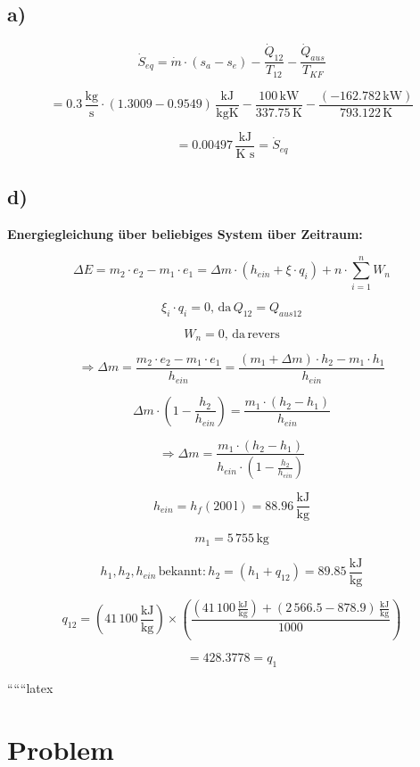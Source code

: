 \subsection*{a)}

\[
\dot{S}_{eq} = \dot{m} \cdot (s_{a} - s_{e}) - \frac{\dot{Q}_{12}}{T_{12}} - \frac{\dot{Q}_{aus}}{T_{KF}}
\]

\[
= 0.3 \, \frac{\text{kg}}{\text{s}} \cdot (1.3009 - 0.9549) \, \frac{\text{kJ}}{\text{kgK}} - \frac{100 \, \text{kW}}{337.75 \, \text{K}} - \frac{(-162.782 \, \text{kW})}{793.122 \, \text{K}}
\]

\[
= 0.00497 \, \frac{\text{kJ}}{\text{K s}} = \dot{S}_{eq}
\]

\subsection*{d)}

\textbf{Energiegleichung über beliebiges System über Zeitraum:}

\[
\Delta E = m_2 \cdot e_2 - m_1 \cdot e_1 = \Delta m \cdot (h_{ein} + \xi \cdot q_i) + n \cdot \sum_{i=1}^{n} W_{n}
\]

\[
\xi_i \cdot q_i = 0, \, \text{da} \, Q_{12} = Q_{aus12}
\]

\[
W_{n} = 0, \, \text{da} \, \text{revers}
\]

\[
\Rightarrow \Delta m = \frac{m_2 \cdot e_2 - m_1 \cdot e_1}{h_{ein}} = \frac{(m_1 + \Delta m) \cdot h_{2} - m_1 \cdot h_{1}}{h_{ein}}
\]

\[
\Delta m \cdot (1 - \frac{h_{2}}{h_{ein}}) = \frac{m_1 \cdot (h_{2} - h_{1})}{h_{ein}}
\]

\[
\Rightarrow \Delta m = \frac{m_1 \cdot (h_{2} - h_{1})}{h_{ein} \cdot (1 - \frac{h_{2}}{h_{ein}})}
\]

\[
h_{ein} = h_{f} (200 \, \text{l}) = 88.96 \, \frac{\text{kJ}}{\text{kg}}
\]

\[
m_1 = 5 \, 755 \, \text{kg}
\]

\[
h_{1}, h_{2}, h_{ein} \, \text{bekannt:} \, h_{2} = (h_{1} + q_{12}) = 89.85 \, \frac{\text{kJ}}{\text{kg}}
\]

\[
q_{12} = (41 \, 100 \, \frac{\text{kJ}}{\text{kg}}) \times \left( \frac{(41 \, 100 \, \frac{\text{kJ}}{\text{kg}}) + (2 \, 566.5 - 878.9) \, \frac{\text{kJ}}{\text{kg}}}{1000} \right)
\]

\[
= 428.3778 = q_{1}
\]

``````latex


\section*{Problem}

